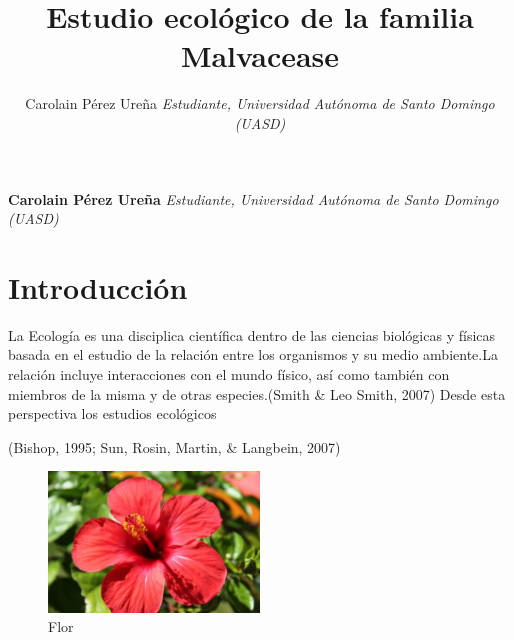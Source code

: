 \documentclass[11pt,]{article}
\title{Estudio ecológico de la familia Malvacease  }
\author{\Large Carolain Pérez Ureña\vspace{0.05in} \newline\normalsize\emph{Estudiante, Universidad Autónoma de Santo Domingo (UASD)}  }
\date{}
\newcommand*{\authorfont}{\fontfamily{phv}\selectfont}
\begin{document}
	
%

{%
\setlength{\parindent}{0pt}
\thispagestyle{plain}
{\fontsize{18}{20}\selectfont\raggedright 
\maketitle  %

}

{
   \vskip 13.5pt\relax \normalsize\fontsize{11}{12} 
\textbf{\authorfont Carolain Pérez Ureña} \hskip 15pt \emph{\small Estudiante, Universidad Autónoma de Santo Domingo (UASD)}   

}

}






\vskip 6.5pt


\noindent  \section{Introducción}\label{introducciuxf3n}

La Ecología es una disciplica científica dentro de las ciencias
biológicas y físicas basada en el estudio de la relación entre los
organismos y su medio ambiente.La relación incluye interacciones con el
mundo físico, así como también con miembros de la misma y de otras
especies.(Smith \& Leo Smith, 2007) Desde esta perspectiva los estudios
ecológicos

(Bishop, 1995; Sun, Rosin, Martin, \& Langbein, 2007)

\begin{figure}
\centering
\includegraphics[width=0.50000\textwidth]{Hibiscus-Malvaceae.jpg}
\caption{Flor}
\end{figure}
\end{document}
